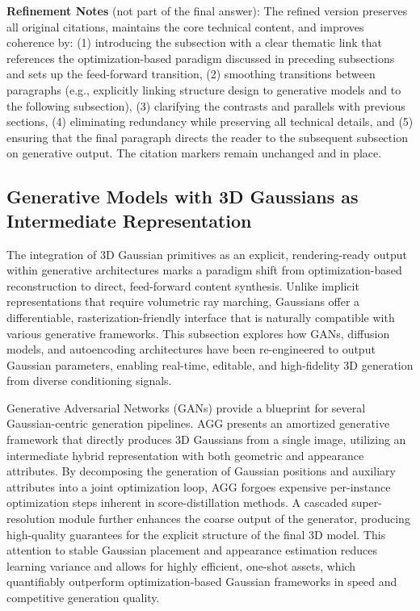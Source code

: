 \documentclass[11pt,a4paper]{article}
\begin{document}
\textbf{Refinement Notes} (not part of the final answer): The refined version preserves all original citations, maintains the core technical content, and improves coherence by: (1) introducing the subsection with a clear thematic link that references the optimization-based paradigm discussed in preceding subsections and sets up the feed-forward transition, (2) smoothing transitions between paragraphs (e.g., explicitly linking structure design to generative models and to the following subsection), (3) clarifying the contrasts and parallels with previous sections, (4) eliminating redundancy while preserving all technical details, and (5) ensuring that the final paragraph directs the reader to the subsequent subsection on generative output. The citation markers remain unchanged and in place.


\subsection{Generative Models with 3D Gaussians as Intermediate Representation}


The integration of 3D Gaussian primitives as an explicit, rendering-ready output within generative architectures marks a paradigm shift from optimization-based reconstruction to direct, feed-forward content synthesis. Unlike implicit representations that require volumetric ray marching, Gaussians offer a differentiable, rasterization-friendly interface that is naturally compatible with various generative frameworks. This subsection explores how GANs, diffusion models, and autoencoding architectures have been re-engineered to output Gaussian parameters, enabling real-time, editable, and high-fidelity 3D generation from diverse conditioning signals.

Generative Adversarial Networks (GANs) provide a blueprint for several Gaussian-centric generation pipelines. AGG \cite{arxiv:2401.04099v1} presents an amortized generative framework that directly produces 3D Gaussians from a single image, utilizing an intermediate hybrid representation with both geometric and appearance attributes. By decomposing the generation of Gaussian positions and auxiliary attributes into a joint optimization loop, AGG forgoes expensive per-instance optimization steps inherent in score-distillation methods. A cascaded super-resolution module further enhances the coarse output of the generator, producing high-quality guarantees for the explicit structure of the final 3D model. This attention to stable Gaussian placement and appearance estimation reduces learning variance and allows for highly efficient, one-shot assets, which quantifiably outperform optimization-based Gaussian frameworks in speed and competitive generation quality.
\end{document}
